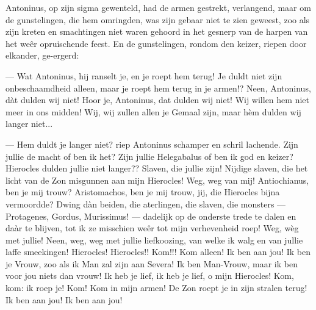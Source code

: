 \documentclass[a4paper, 12pt, oneside, dutch]{article}
\begin{document}
Antoninus, op zijn sigma gewenteld, had de armen gestrekt, verlangend, maar om de gunstelingen, die hem omringden, was zijn gebaar niet te zien geweest, zoo als zijn kreten en smachtingen niet waren gehoord in het gesnerp van de harpen van het weêr opruischende feest. En de gunstelingen, rondom den keizer, riepen door elkander, ge-ergerd:

--- Wat Antoninus, hij ranselt je, en je roept hem terug! Je duldt niet zijn onbeschaamdheid alleen, maar je roept hem terug in je armen!? Neen, Antoninus, dàt dulden wij niet! Hoor je, Antoninus, dat dulden wij niet! Wij willen hem niet meer in ons midden! Wij, wij zullen allen je Gemaal zijn, maar hèm dulden wij langer niet...

--- Hem duldt je langer niet? riep Antoninus schamper en schril lachende. Zijn jullie de macht of ben ik het? Zijn jullie Helegabalus of ben ik god en keizer? Hierocles dulden jullie niet langer?? Slaven, die jullie zijn! Nijdige slaven, die het licht van de Zon misgunnen aan mijn Hierocles! Weg, weg van mij! Antiochianus, ben je mij trouw? Aristomachos, ben je mij trouw, jij, die Hierocles bijna vermoordde? Dwing dàn beiden, die aterlingen, die slaven, die monsters --- Protagenes, Gordus, Murissimus! --- dadelijk op de onderste trede te dalen en daàr te blijven, tot ik ze misschien weêr tot mijn verhevenheid roep! Weg, wèg met jullie! Neen, weg, weg met jullie liefkoozing, van welke ik walg en van jullie laffe smeekingen! Hierocles! Hierocles!! Kom!!! Kom alleen! Ik ben aan jou! Ik ben je Vrouw, zoo als ik Man zal zijn aan Severa! Ik ben Man-Vrouw, maar ik ben voor jou niets dan vrouw! Ik heb je lief, ik heb je lief, o mijn Hierocles! Kom, kom: ik roep je! Kom! Kom in mijn armen! De Zon roept je in zijn stralen terug! Ik ben aan jou! Ik ben aan jou!
\end{document}
